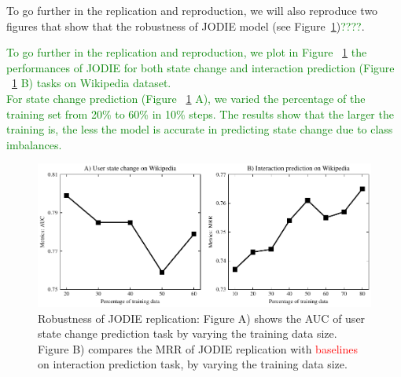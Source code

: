 To go further in the replication and reproduction, we  will also reproduce two figures that show that the robustness of JODIE model (see Figure~\ref{percentage-train})\textcolor{green}{????}. 


\textcolor{green}{To go further in the replication and reproduction, we plot in Figure ~\ref{percentage-train} the performances of JODIE for both state change and  interaction prediction (Figure ~\ref{percentage-train} B) tasks on Wikipedia dataset. \\
For state change prediction  (Figure ~\ref{percentage-train}  A), we varied the percentage of the training set from 20\% to 60\% in 10\% steps. The results show that the larger the training is, the less the model is accurate in predicting state change due to class imbalances.  }

\begin{figure}[htbp]
    \centering
    \includegraphics[width = \textwidth]{image/percentage_train.pdf}
    \caption{Robustness of JODIE replication: Figure A) shows the AUC of user state change prediction task by varying the training data size.  Figure B) compares the MRR of JODIE replication with \textcolor{red}{baselines} on interaction prediction task, by varying the training data size. }
    \label{percentage-train}
\end{figure}

